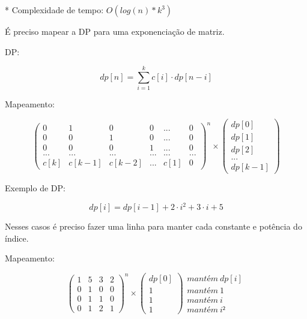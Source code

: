 \documentclass[11pt, a4paper, twoside]{book}
\begin{document}
* Complexidade de tempo: $O(log(n)*k^3)$



É preciso mapear a DP para uma exponenciação de matriz.







\textbf{} 


DP:   

$$ dp[n] = \sum_{i=1}^{k} c[i] \cdot dp[n - i]$$ 



Mapeamento:   



$$ \begin{pmatrix} 0&1&0&0&...&0 \\ 0&0&1&0&...&0 \\ 0&0&0&1&...&0 \\ ...&...&...&...&...&... \\ c[k]&c[k-1]&c[k-2]&...&c[1]&0 \end{pmatrix}^n \times \begin{pmatrix} dp[0] \\ dp[1] \\ dp[2] \\ ... \\ dp[k-1] \end{pmatrix} $$



\textbf{} 


Exemplo de DP:   



$$ dp[i] = dp[i-1] + 2 \cdot i^2 + 3 \cdot i + 5 $$



Nesses casos é preciso fazer uma linha para manter cada constante e potência do índice.



Mapeamento:



$$ \begin{pmatrix} 1&5&3&2 \\ 0&1&0&0 \\ 0&1&1&0 \\ 0&1&2&1 \end{pmatrix}^n \times \begin{pmatrix} dp[0]   \\ 1       \\ 1       \\ 1\end {pmatrix} \begin{matrix} mantém\ dp[i]   \\ mantém\ 1       \\ mantém\ i       \\ mantém\ i²      \end {matrix} $$
\end{document}
